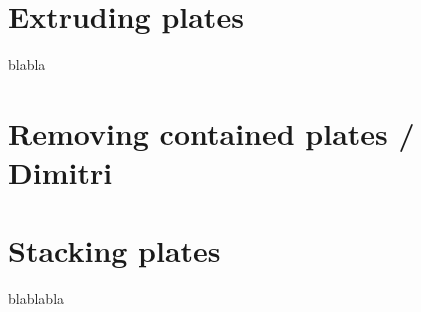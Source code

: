 \documentclass[../ClassicThesis.tex]{subfiles}
\begin{document}
\section{Extruding plates}

blabla

\section{Removing contained plates / Dimitri}

\section{Stacking plates}

blablabla


\end{document}
